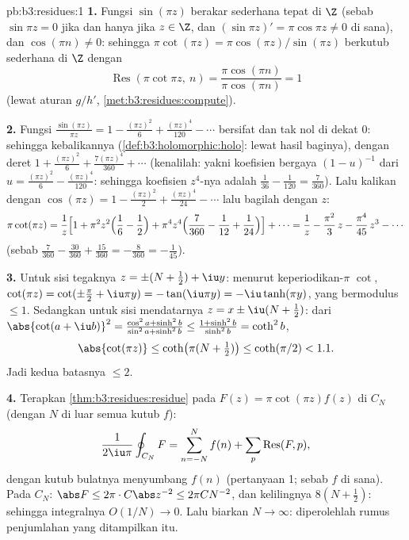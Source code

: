 \begin{solution}{pb:b3:residues:1}
\textbf{1.} Fungsi $\sin(\pi z)$ berakar sederhana tepat di $\Z$
(sebab $\sin\pi z = 0$ jika dan hanya jika $z \in \Z$, dan $(\sin\pi z)' = \pi\cos\pi
z \neq 0$ di sana), dan $\cos(\pi n) \neq 0$: sehingga $\pi\cot(\pi z) =
\pi\cos(\pi z)/\sin(\pi z)$ berkutub sederhana di $\Z$ dengan
\[
\operatorname{Res}(\pi\cot\pi z,\ n)
= \frac{\pi\cos(\pi n)}{\pi\cos(\pi n)} = 1
\]
(lewat aturan $g/h'$, \cref{met:b3:residues:compute}).

\textbf{2.} Fungsi $\frac{\sin(\pi z)}{\pi z} = 1 - \frac{(\pi z)^2}6
+ \frac{(\pi z)^4}{120} - \cdots$ bersifat  dan tak nol
di dekat $0$: sehingga kebalikannya 
(\cref{def:b3:holomorphic:holo}: lewat hasil baginya), dengan deret $1 +
\frac{(\pi z)^2}{6} + \frac{7(\pi z)^4}{360} + \cdots$
(kenalilah: yakni koefisien bergaya $(1 - u)^{-1}$ dari $u =
\frac{(\pi z)^2}6 - \frac{(\pi z)^4}{120}$: sehingga koefisien $z^4$-nya
adalah $\frac1{36} - \frac1{120} = \frac{7}{360}$).
Lalu kalikan dengan $\cos(\pi z) = 1 - \frac{(\pi z)^2}2 + \frac{(\pi
z)^4}{24} - \cdots$ lalu bagilah dengan $z$:
\[
\pi\cot(\pi z) = \frac1z\Bigl[1 + \pi^2z^2\Bigl(\frac16 -
\frac12\Bigr) + \pi^4z^4\Bigl(\frac7{360} - \frac1{12} +
\frac1{24}\Bigr)\Bigr] + \cdots
= \frac1z - \frac{\pi^2}3\,z - \frac{\pi^4}{45}\,z^3 -
\cdots
\]
(sebab $\frac7{360} - \frac{30}{360} + \frac{15}{360} =
-\frac8{360} = -\frac1{45}$).

\textbf{3.} Untuk sisi tegaknya $z = \pm(N + \frac12) + \iu y$:
menurut keperiodikan-$\pi$ $\cot$, $\cot(\pi z) = \cot(\pm\frac\pi2
+ \iu\pi y) = -\tan(\iu\pi y) = -\iu\tanh(\pi y)$, yang bermodulus
$\leq 1$. Sedangkan untuk sisi mendatarnya $z = x \pm \iu(N + \frac12)$: dari
$\abs{\cot(a + \iu b)}^2 = \frac{\cos^2a +
\sinh^2b}{\sin^2a + \sinh^2b} \leq \frac{1 +
\sinh^2b}{\sinh^2b} = \coth^2 b$,
\[
\abs{\cot(\pi z)} \leq \coth\bigl(\pi(N + \tfrac12)\bigr)
\leq \coth(\pi/2) < 1.1 .
\]
Jadi kedua batasnya $\leq 2$.

\textbf{4.} Terapkan \cref{thm:b3:residues:residue} pada $F(z) =
\pi\cot(\pi z)f(z)$ di $C_N$ (dengan $N$ di luar semua kutub $f$):
\[
\frac1{2\iu\pi}\oint_{C_N}F = \sum_{n=-N}^{N}f(n) +
\sum_p\operatorname{Res}(F, p),
\]
dengan kutub bulatnya menyumbang $f(n)$ (pertanyaan 1; sebab $f$
 di sana). Pada $C_N$: $\abs F \leq 2\pi\cdot
C\abs z^{-2} \leq 2\pi C N^{-2}$, dan kelilingnya $8(N +
\frac12)$: sehingga integralnya $O(1/N) \to 0$. Lalu biarkan $N \to
\infty$: diperolehlah rumus penjumlahan yang ditampilkan itu.


\end{solution}
